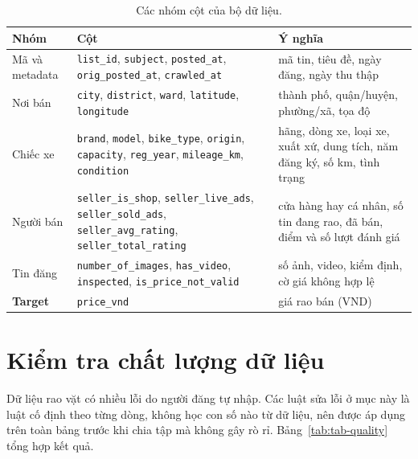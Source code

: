 \begin{table}[H]\centering
\caption{Các nhóm cột của bộ dữ liệu.}\label{tab:tab-cols}
\begin{tabular}{>{\raggedright\arraybackslash}p{2.6cm}>{\raggedright\arraybackslash}p{6.2cm}>{\raggedright\arraybackslash}p{5.4cm}}
\toprule
Nhóm & Cột & Ý nghĩa \\
\midrule
Mã và metadata & \texttt{list\_id}, \texttt{subject}, \texttt{posted\_at}, \texttt{orig\_posted\_at}, \texttt{crawled\_at} & mã tin, tiêu đề, ngày đăng, ngày thu thập \\
Nơi bán & \texttt{city}, \texttt{district}, \texttt{ward}, \texttt{latitude}, \texttt{longitude} & thành phố, quận/huyện, phường/xã, tọa độ \\
Chiếc xe & \texttt{brand}, \texttt{model}, \texttt{bike\_type}, \texttt{origin}, \texttt{capacity}, \texttt{reg\_year}, \texttt{mileage\_km}, \texttt{condition} & hãng, dòng xe, loại xe, xuất xứ, dung tích, năm đăng ký, số km, tình trạng \\
Người bán & \texttt{seller\_is\_shop}, \texttt{seller\_live\_ads}, \texttt{seller\_sold\_ads}, \texttt{seller\_avg\_rating}, \texttt{seller\_total\_rating} & cửa hàng hay cá nhân, số tin đang rao, đã bán, điểm và số lượt đánh giá \\
Tin đăng & \texttt{number\_of\_images}, \texttt{has\_video}, \texttt{inspected}, \texttt{is\_price\_not\_valid} & số ảnh, video, kiểm định, cờ giá không hợp lệ \\
\textbf{Target} & \texttt{price\_vnd} & giá rao bán (VND) \\
\bottomrule
\end{tabular}
\end{table}

\section{Kiểm tra chất lượng dữ liệu}

Dữ liệu rao vặt có nhiều lỗi do người đăng tự nhập. Các luật sửa lỗi ở mục này là luật cố định theo từng dòng, không
học con số nào từ dữ liệu, nên được áp dụng trên toàn bảng trước khi chia tập mà không gây rò rỉ. Bảng~\ref{tab:tab-quality}
tổng hợp kết quả.

